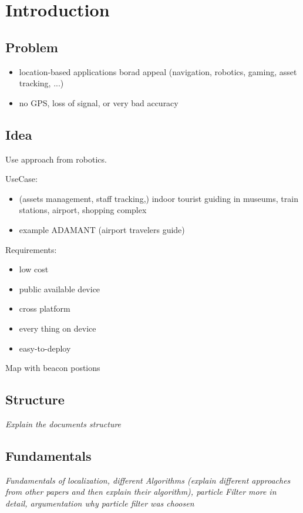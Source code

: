 \chapter{Introduction} \label{chap:intro}

\section{Problem}
\begin{itemize}
\item location-based applications borad appeal (navigation, robotics, gaming, asset tracking, ...)
\item no GPS, loss of signal, or very bad accuracy
\end{itemize}

\section{Idea}

Use approach from robotics.

UseCase:
\begin{itemize}
  \item (assets management, staff tracking,) indoor tourist guiding in museums, train stations, airport, shopping complex \cite{wang_2013}
  \item example ADAMANT (airport travelers guide) \cite{wang_2013}
\end{itemize}

Requirements:
\begin{itemize}
\item low cost
\item public available device
\item cross platform
\item every thing on device \cite{wang_2013}
\item easy-to-deploy \cite{wang_2013}
\end{itemize}

Map with beacon postions

\section{Structure}
\textit{Explain the documents structure}


\section{Fundamentals}
\textit{Fundamentals of localization, different Algorithms (explain different approaches from other papers and then explain their algorithm), particle Filter more in detail, argumentation why particle filter was choosen}

